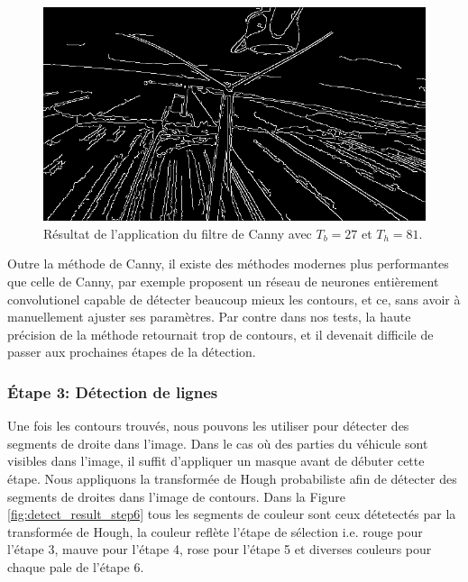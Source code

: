 
\begin{figure}[htp]
  \centering
  \includegraphics[width=0.6\linewidth]{images/canny.png}
  \caption{Résultat de l'application du filtre de Canny avec $T_b = 27$ et $T_h = 81$.}
  \label{fig:canny}
\end{figure}

Outre la méthode de Canny, il existe des méthodes modernes plus performantes que celle de Canny, par exemple \citep{Xie2015} proposent un réseau de neurones entièrement convolutionel capable de détecter beaucoup mieux les contours, et ce, sans avoir à manuellement ajuster ses paramètres. Par contre dans nos tests, la haute précision de la méthode retournait trop de contours, et il devenait difficile de passer aux prochaines étapes de la détection.

\subsubsection{Étape 3: Détection de lignes}

Une fois les contours trouvés, nous pouvons les utiliser pour détecter des segments de droite dans l'image. Dans le cas où des parties du véhicule sont visibles dans l'image, il suffit d'appliquer un masque avant de débuter cette étape. Nous appliquons la transformée de Hough probabiliste \citep{Matas2000} afin de détecter des segments de droites dans l'image de contours. Dans la Figure \ref{fig:detect_result_step6} tous les segments de couleur sont ceux détetectés par la transformée de Hough, la couleur reflète l'étape de sélection i.e. rouge pour l'étape 3, mauve pour l'étape 4, rose pour l'étape 5 et diverses couleurs pour chaque pale de l'étape 6.

